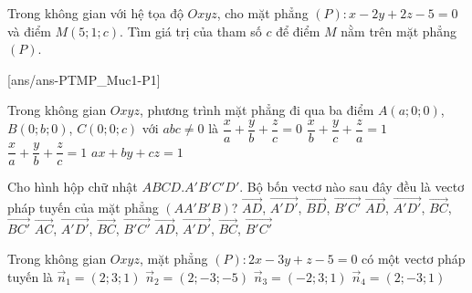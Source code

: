 \setcounter{subsection}{0}

\begin{vd}
Trong không gian với hệ tọa độ $Oxyz$, cho mặt phẳng $(P)\colon x - 2y + 2z - 5 = 0$ và điểm $M(5; 1; c)$. Tìm giá trị của tham số $c$ để điểm $M$ nằm trên mặt phẳng $(P)$.
\end{vd}

\caulc
{}[ans/ans-PTMP_Muc1-P1]

\begin{ex}%
Trong không gian $Oxyz$, phương trình mặt phẳng đi qua ba điểm $A(a;0;0)$, $B(0;b;0)$, $C(0;0;c)$ với $abc \ne 0$ là
\choice
{$\dfrac{x}{a} + \dfrac{y}{b} + \dfrac{z}{c} = 0$}
{$\dfrac{x}{b} + \dfrac{y}{c} + \dfrac{z}{a} = 1$}
{\True $\dfrac{x}{a} + \dfrac{y}{b} + \dfrac{z}{c} = 1$}
{$ax + by + cz = 1$}
\end{ex}

\begin{ex}%
Cho hình hộp chữ nhật $ABCD.A'B'C'D'$. Bộ bốn vectơ nào sau đây đều là vectơ pháp tuyến của mặt phẳng $(AA'B'B)$?
\choice
{$\overrightarrow{AD}$, $\overrightarrow{A'D'}$, $\overrightarrow{BD}$, $\overrightarrow{B'C'}$}
{$\overrightarrow{AD}$, $\overrightarrow{A'D'}$, $\overrightarrow{BC}$, $\overrightarrow{BC'}$}
{$\overrightarrow{AC}$, $\overrightarrow{A'D'}$, $\overrightarrow{BC}$, $\overrightarrow{B'C'}$}
{\True $\overrightarrow{AD}$, $\overrightarrow{A'D'}$, $\overrightarrow{BC}$, $\overrightarrow{B'C'}$}
\end{ex}

\begin{ex}%
Trong không gian $Oxyz$, mặt phẳng $(P)\colon 2x - 3y + z - 5 = 0$ có một vectơ pháp tuyến là
\choice
{$\overrightarrow{n}_1 = (2; 3; 1)$}
{$\overrightarrow{n}_2 = (2; -3; -5)$}
{$\overrightarrow{n}_3 = (-2; 3; 1)$}
{\True $\overrightarrow{n}_4 = (2; -3; 1)$}
\end{ex}

